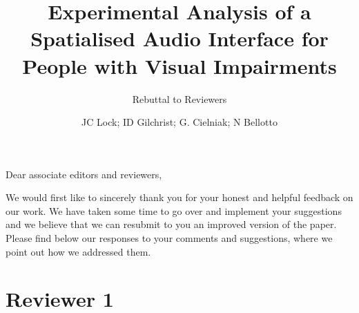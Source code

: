 \documentclass{scrartcl}
\begin{document}
\title{Experimental Analysis of a Spatialised Audio Interface for People with Visual Impairments}
\subtitle{Rebuttal to Reviewers}

\author{JC Lock; ID Gilchrist; G. Cielniak; N Bellotto}

\maketitle

\noindent Dear associate editors and reviewers,

We would first like to sincerely thank you for your honest and helpful feedback on our work.
We have taken some time to go over and implement your suggestions and we believe that we can resubmit to you an improved version of the paper. 
Please find below our responses to your comments and suggestions, where we point out how we addressed them.

\section*{Reviewer 1} 
\end{document}
